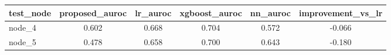 \begin{tabular*}{\linewidth}{@{\extracolsep{\fill}}lccccc@{}}
\toprule
test\_node & proposed\_auroc & lr\_auroc & xgboost\_auroc & nn\_auroc & improvement\_vs\_lr \\
\midrule
node\_4 & 0.602 & 0.668 & 0.704 & 0.572 & -0.066 \\
node\_5 & 0.478 & 0.658 & 0.700 & 0.643 & -0.180 \\
\bottomrule
\end{tabular*}
